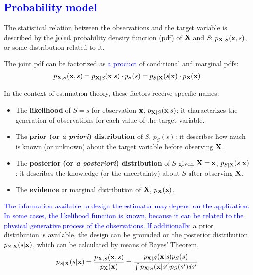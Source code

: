 \subsection{\textcolor{blue}{Probability model}}
\label{subsec:statistical_info}

The statistical relation between the observations and the target variable is described by the {\bf joint} probability density function (pdf) of ${\bf X}$ and $S$: $p_{{\bf X},S}({\bf x},s)$, or some distribution related to it. 

The joint pdf can be factorized as \textcolor{blue}{a product} of conditional and marginal pdfs:
\begin{align}
p_{{\bf X},S}({\bf x},s) = p_{{\bf X}| S}({\bf x}| s) \cdot p_S(s) 
                         = p_{S|{\bf X}}(s|{\bf x}) \cdot p_{\bf X}({\bf x}) 
\end{align}

In the context of estimation theory, these factors receive specific names:

\begin{itemize}
\item The {\bf likelihood} of $S=s$ for observation ${\bf x}$, $p_{{\bf X}|S}({\bf x}|s)$: it characterizes the generation of observations for each value of the target variable.
\item The {\bf prior (or \textit{a priori}) distribution}  of $S$, $p_S(s)$: it describes how much is known (or unknown) about the target variable before observing ${\bf X}$. 
\item The {\bf posterior (or \textit{a posteriori}) distribution} of $S$ given ${\bf X}={\bf x}$, $p_{S|{\bf X}}(s|{\bf x})$: it describes the knowledge (or the uncertainty) about $S$ after observing ${\bf X}$.
\item The {\bf evidence} or marginal distribution of ${\bf X}$, $p_{{\bf X}}({\bf x})$.
\end{itemize}

\textcolor{blue}{The information available to design the estimator may depend on the application. In some cases, the likelihood function is known, because it can be related to the physical generative process of the observations. If additionally}, a prior distribution is available, the design can be grounded on the posterior distribution $p_{S|{\bf X}}(s|{\bf x})$, which can be calculated by means of Bayes' Theorem,
\begin{equation}
p_{S|{\bf X}}(s|{\bf x}) 
	= \frac{p_{{\bf X},S}({\bf x},s)} {p_{\bf X}({\bf x})} 
	= \frac{p_{{\bf X}|S}({\bf x}|s) p_S(s)}
	       {\int p_{{\bf X}|S}({\bf x}|s') p_S(s') ds'}
\end{equation}


